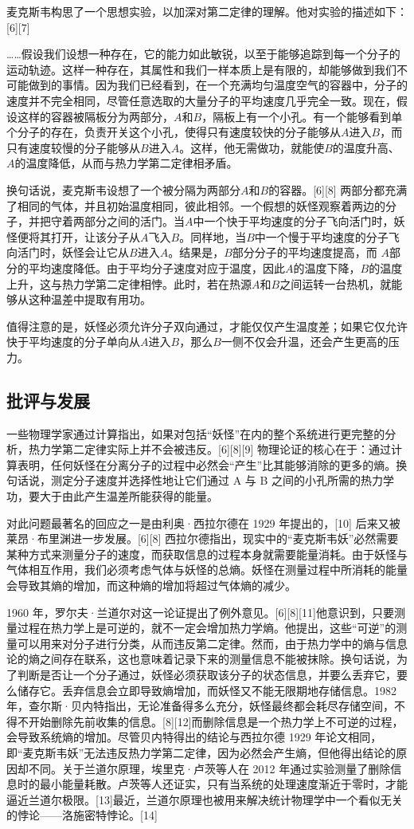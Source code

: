 麦克斯韦构思了一个思想实验，以加深对第二定律的理解。他对实验的描述如下：[6][7]

……假设我们设想一种存在，它的能力如此敏锐，以至于能够追踪到每一个分子的运动轨迹。这样一种存在，其属性和我们一样本质上是有限的，却能够做到我们不可能做到的事情。因为我们已经看到，在一个充满均匀温度空气的容器中，分子的速度并不完全相同，尽管任意选取的大量分子的平均速度几乎完全一致。现在，假设这样的容器被隔板分为两部分，$A$和$B$，隔板上有一个小孔。有一个能够看到单个分子的存在，负责开关这个小孔，使得只有速度较快的分子能够从$A$进入$B$，而只有速度较慢的分子能够从$B$进入$A$。这样，他无需做功，就能使$B$的温度升高、$A$的温度降低，从而与热力学第二定律相矛盾。

换句话说，麦克斯韦设想了一个被分隔为两部分$A$和$B$的容器。[6][8] 两部分都充满了相同的气体，并且初始温度相同，彼此相邻。一个假想的妖怪观察着两边的分子，并把守着两部分之间的活门。当$A$中一个快于平均速度的分子飞向活门时，妖怪便将其打开，让该分子从$A$飞入$B$。同样地，当$B$中一个慢于平均速度的分子飞向活门时，妖怪会让它从$B$进入$A$。结果是，$B$部分分子的平均速度提高，而 $A$部分的平均速度降低。由于平均分子速度对应于温度，因此$A$的温度下降，$B$的温度上升，这与热力学第二定律相悖。此时，若在热源$A$和$B$之间运转一台热机，就能够从这种温差中提取有用功。

值得注意的是，妖怪必须允许分子双向通过，才能仅仅产生温度差；如果它仅允许快于平均速度的分子单向从$A$进入$B$，那么$B$一侧不仅会升温，还会产生更高的压力。
\subsection{批评与发展}
一些物理学家通过计算指出，如果对包括“妖怪”在内的整个系统进行更完整的分析，热力学第二定律实际上并不会被违反。[6][8][9] 物理论证的核心在于：通过计算表明，任何妖怪在分离分子的过程中必然会“产生”比其能够消除的更多的熵。换句话说，测定分子速度并选择性地让它们通过 A 与 B 之间的小孔所需的热力学功，要大于由此产生温差所能获得的能量。

对此问题最著名的回应之一是由利奥·西拉尔德在 1929 年提出的，[10] 后来又被莱昂·布里渊进一步发展。[6][8] 西拉尔德指出，现实中的“麦克斯韦妖”必然需要某种方式来测量分子的速度，而获取信息的过程本身就需要能量消耗。由于妖怪与气体相互作用，我们必须考虑气体与妖怪的总熵。妖怪在测量过程中所消耗的能量会导致其熵的增加，而这种熵的增加将超过气体熵的减少。

1960 年，罗尔夫·兰道尔对这一论证提出了例外意见。[6][8][11]他意识到，只要测量过程在热力学上是可逆的，就不一定会增加热力学熵。他提出，这些“可逆”的测量可以用来对分子进行分类，从而违反第二定律。然而，由于热力学中的熵与信息论的熵之间存在联系，这也意味着记录下来的测量信息不能被抹除。换句话说，为了判断是否让一个分子通过，妖怪必须获取该分子的状态信息，并要么丢弃它，要么储存它。丢弃信息会立即导致熵增加，而妖怪又不能无限期地存储信息。1982 年，查尔斯·贝内特指出，无论准备得多么充分，妖怪最终都会耗尽存储空间，不得不开始删除先前收集的信息。[8][12]而删除信息是一个热力学上不可逆的过程，会导致系统熵的增加。尽管贝内特得出的结论与西拉尔德 1929 年论文相同，即“麦克斯韦妖”无法违反热力学第二定律，因为必然会产生熵，但他得出结论的原因却不同。关于兰道尔原理，埃里克·卢茨等人在 2012 年通过实验测量了删除信息时的最小能量耗散。卢茨等人还证实，只有当系统的处理速度渐近于零时，才能逼近兰道尔极限。[13]最近，兰道尔原理也被用来解决统计物理学中一个看似无关的悖论——洛施密特悖论。[14]

